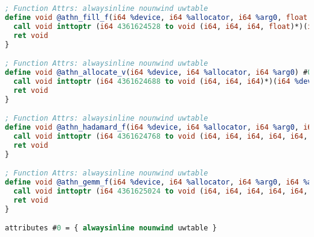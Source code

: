 \begin{lstlisting}[language=llvm,basicstyle=\small,caption=Пример LLVM IR]
; Function Attrs: alwaysinline nounwind uwtable
define void @athn_fill_f(i64 %device, i64 %allocator, i64 %arg0, float %arg1) #0 {
  call void inttoptr (i64 4361624528 to void (i64, i64, i64, float)*)(i64 %device, i64 %allocator, i64 %arg0, float %arg1)
  ret void
}

; Function Attrs: alwaysinline nounwind uwtable
define void @athn_allocate_v(i64 %device, i64 %allocator, i64 %arg0) #0 {
  call void inttoptr (i64 4361624688 to void (i64, i64, i64)*)(i64 %device, i64 %allocator, i64 %arg0)
  ret void
}

; Function Attrs: alwaysinline nounwind uwtable
define void @athn_hadamard_f(i64 %device, i64 %allocator, i64 %arg0, i64 %arg1, i64 %arg2, i64 %arg3) #0 {
  call void inttoptr (i64 4361624768 to void (i64, i64, i64, i64, i64, i64)*)(i64 %device, i64 %allocator, i64 %arg0, i64 %arg1, i64 %arg2, i64 %arg3)
  ret void
}

; Function Attrs: alwaysinline nounwind uwtable
define void @athn_gemm_f(i64 %device, i64 %allocator, i64 %arg0, i64 %arg1, i64 %arg2, i64 %arg3) #0 {
  call void inttoptr (i64 4361625024 to void (i64, i64, i64, i64, i64, i64)*)(i64 %device, i64 %allocator, i64 %arg0, i64 %arg1, i64 %arg2, i64 %arg3)
  ret void
}

attributes #0 = { alwaysinline nounwind uwtable }
\end{lstlisting}

